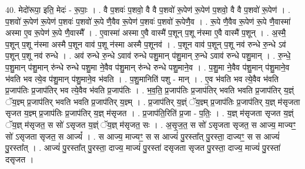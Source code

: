 \documentclass[17pt]{extarticle}
\begin{document}
40. मेदो॑रूपा॒ इति॒ मेदः॑ - रू॒पाः॒ । . वै प॒शवः॑ प॒शवो॒ वै वै प॒शवो॑ रू॒पेण॑ रू॒पेण॑ प॒शवो॒ वै वै प॒शवो॑ रू॒पेण॑ । . प॒शवो॑ रू॒पेण॑ रू॒पेण॑ प॒शवः॑ प॒शवो॑ रू॒पे णै॒वैव रू॒पेण॑ प॒शवः॑ प॒शवो॑ रू॒पेणै॒व । . रू॒पे णै॒वैव रू॒पेण॑ रू॒पे णै॒वास्मा॑ अस्मा ए॒व रू॒पेण॑ रू॒पे णै॒वास्मै᳚ । . ए॒वास्मा॑ अस्मा ए॒वै वास्मै॑ प॒शून् प॒शू न॑स्मा ए॒वै वास्मै॑ प॒शून् । . अ॒स्मै॒ प॒शून् प॒शू न॑स्मा अस्मै प॒शून वाव॑ प॒शू न॑स्मा अस्मै प॒शूनव॑ । . प॒शून वाव॑ प॒शून् प॒शू नव॑ रुन्धे रु॒न्धे ऽव॑ प॒शून् प॒शू नव॑ रुन्धे । . अव॑ रुन्धे रु॒न्धे ऽवाव॑ रुन्धे पशु॒मान् प॑शु॒मान् रु॒न्धे ऽवाव॑ रुन्धे पशु॒मान् । . रु॒न्धे॒ प॒शु॒मान् प॑शु॒मान् रु॑न्धे रुन्धे पशु॒मा ने॒वैव प॑शु॒मान् रु॑न्धे रुन्धे पशु॒माने॒व । . प॒शु॒मा ने॒वैव प॑शु॒मान् प॑शु॒माने॒व भ॑वति भव त्ये॒व प॑शु॒मान् प॑शु॒माने॒व भ॑वति । . प॒शु॒मानिति॑ पशु - मान् । . ए॒व भ॑वति भव त्ये॒वैव भ॑वति प्र॒जाप॑तिः प्र॒जाप॑तिर् भव त्ये॒वैव भ॑वति प्र॒जाप॑तिः । . भ॒व॒ति॒ प्र॒जाप॑तिः प्र॒जाप॑तिर् भवति भवति प्र॒जाप॑तिर् य॒ज्ञ्ं ॅय॒ज्ञ्म् प्र॒जाप॑तिर् भवति भवति प्र॒जाप॑तिर् य॒ज्ञ्म् । . प्र॒जाप॑तिर् य॒ज्ञ्ं ॅय॒ज्ञ्म् प्र॒जाप॑तिः प्र॒जाप॑तिर् य॒ज्ञ् म॑सृजता सृजत य॒ज्ञ्म् प्र॒जाप॑तिः प्र॒जाप॑तिर् य॒ज्ञ् म॑सृजत । . प्र॒जाप॑ति॒रिति॑ प्र॒जा - प॒तिः॒ । . य॒ज्ञ् म॑सृजता सृजत य॒ज्ञ्ं ॅय॒ज्ञ् म॑सृजत॒ स सो॑ ऽसृजत य॒ज्ञ्ं ॅय॒ज्ञ् म॑सृजत॒ सः । . अ॒सृ॒ज॒त॒ स सो॑ ऽसृजता सृजत॒ स आज्य॒ माज्यꣳ॒॒ सो॑ ऽसृजता सृजत॒ स आज्यं᳚ । . स आज्य॒ माज्यꣳ॒॒ स स आज्यं॑ पु॒रस्ता᳚त् पु॒रस्ता॒ दाज्यꣳ॒॒ स स आज्यं॑ पु॒रस्ता᳚त् । . आज्यं॑ पु॒रस्ता᳚त् पु॒रस्ता॒ दाज्य॒ माज्यं॑ पु॒रस्ता॑ दसृजता सृजत पु॒रस्ता॒ दाज्य॒ माज्यं॑ पु॒रस्ता॑ दसृजत । \newline
\pagebreak
{}
\end{document}
